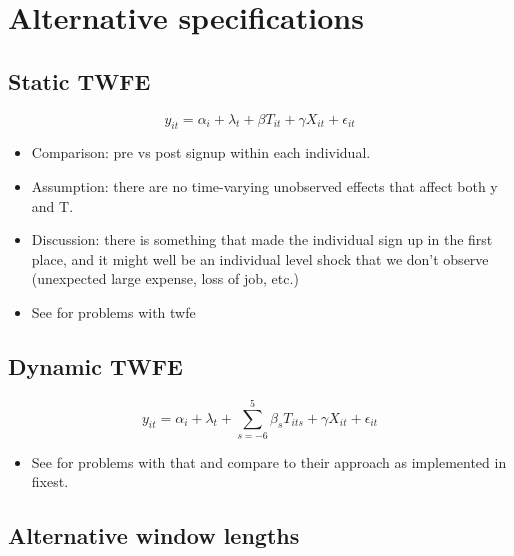 
\section{Alternative specifications}%
\label{sec:alternative_control_group_designs}

\subsection{Static TWFE}%
\label{sub:static_twfe}

\begin{equation}
    y_{it} = \alpha_i + \lambda_t + \beta T_{it} + \gamma X_{it} + \epsilon_{it}
\end{equation}

\begin{itemize}

    \item Comparison: pre vs post signup within each individual.

    \item Assumption: there are no time-varying unobserved effects that affect
        both y and T.

    \item Discussion: there is something that made the individual sign up in
        the first place, and it might well be an individual level shock that we
        don't observe (unexpected large expense, loss of job, etc.)

    \item See \citet{imai2021use} for problems with twfe
\end{itemize}


\subsection{Dynamic TWFE}%
\label{sub:dynamic_twfe}

\begin{equation}
    y_{it} = \alpha_i + \lambda_t + \sum^{5}_{s=-6} \beta_s T_{its} + \gamma X_{it} + \epsilon_{it}
\end{equation}

\begin{itemize}
    \item See \citet{sun2021estimating} for problems with that and compare to
        their approach as implemented in fixest.
\end{itemize}

\subsection{Alternative window lengths}%
\label{sub:alternative_window_lengths}

